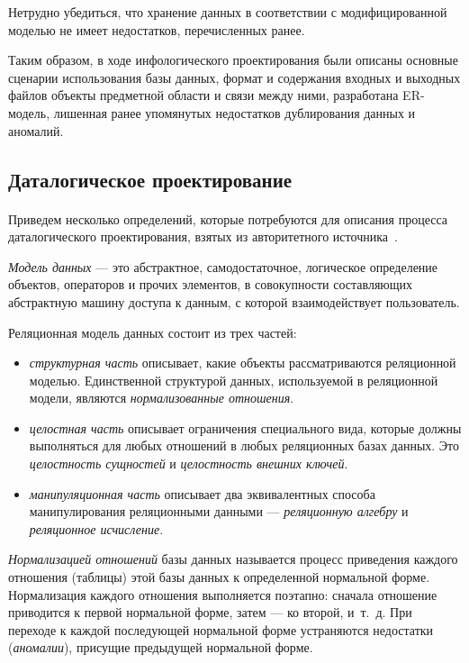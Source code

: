 Нетрудно убедиться,
что хранение данных в соответствии с модифицированной моделью не имеет
недостатков, перечисленных ранее.

Таким образом, в ходе инфологического проектирования были описаны основные
сценарии использования базы данных, формат и содержания входных и выходных файлов
объекты предметной области и связи между ними, разработана ER-модель, лишенная
ранее упомянутых недостатков дублирования данных и аномалий.

\subsection{Даталогическое проектирование}
\label{ssub:db_data_stage}

\paragraph{}
Приведем несколько определений, которые потребуются для описания процесса
даталогического проектирования, взятых из авторитетного источника~\cite{date05}.

\textit{Модель данных} --- это абстрактное, самодостаточное,
логическое определение объектов, операторов и прочих элементов,
в совокупности составляющих абстрактную  машину доступа к данным,
с которой взаимодействует пользователь.

Реляционная модель данных состоит из трех частей:
\begin{itemize}
\item
  \textit{структурная часть} описывает, какие объекты рассматриваются
  реляционной моделью.
  Единственной структурой данных, используемой в реляционной модели,
  являются \textit{нормализованные отношения}.
\item
  \textit{целостная часть} описывает ограничения специального вида,
  которые должны выполняться для любых отношений в любых реляционных базах данных.
  Это \textit{целостность сущностей} и \textit{целостность внешних ключей}.
\item
  \textit{манипуляционная часть} описывает два эквивалентных способа
  манипулирования реляционными данными --- \textit{реляционную алгебру} и
  \textit{реляционное исчисление}.
\end{itemize}

\textit{Нормализацией отношений} базы данных называется процесс приведения каждого отношения
(таблицы) этой базы данных к определенной нормальной форме.
Нормализация каждого отношения выполняется поэтапно:
сначала отношение приводится к первой нормальной форме, затем --- ко второй, и~т.~д.
При переходе к каждой последующей нормальной форме устраняются недостатки
(\textit{аномалии}), присущие предыдущей нормальной форме.

